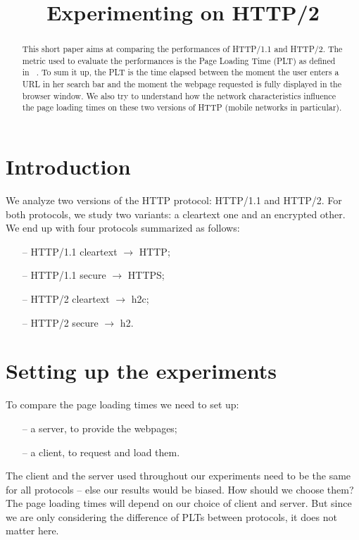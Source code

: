 \documentclass[12pt, notitlepage]{article}
\begin{document}

\title{Experimenting on HTTP/2}
\maketitle
\begin{abstract}
This short paper aims at comparing the performances of HTTP/1.1 and HTTP/2.
The metric used to evaluate the performances is the Page Loading Time
(PLT) as defined in ~\cite{w3c}.
To sum it up, the PLT is the time elapsed between the moment the user
enters a URL in her search bar and the moment the webpage requested is
fully displayed in the browser window. We also try to understand how the
network characteristics influence the page loading times on these two
versions of HTTP (mobile networks in particular).
\end{abstract}

\section{Introduction}

We analyze two versions of the HTTP protocol: HTTP/1.1 and HTTP/2.
For both protocols, we study two variants: a cleartext one and an
encrypted other. We end up with four protocols summarized as follows:
\begin{itemize}
	\item[--] HTTP/1.1 cleartext $\to$ HTTP;
	\item[--] HTTP/1.1 secure $\to$ HTTPS;
	\item[--] HTTP/2 cleartext $\to$ h2c;
	\item[--] HTTP/2 secure $\to$ h2.
\end{itemize}
\newpage
\section{Setting up the experiments}

To compare the page loading times we need to set up: 
\begin{itemize}
\item[--] a server, to provide the webpages;
\item[--] a client, to request and load them.
\end{itemize}

The client and the server used throughout our experiments need to be the
same for all protocols -- else our results would be biased. How should we
choose them?
The page loading times will depend on our choice of client and server. But
since we are only considering the difference of PLTs between protocols, it
does not matter here.
\end{document}

